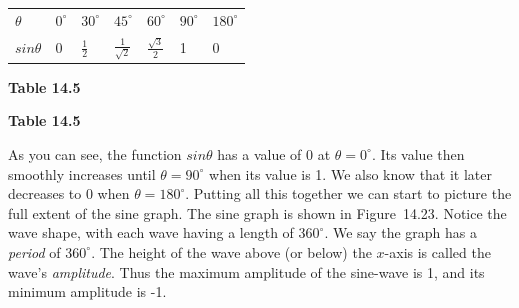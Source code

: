       \begin{table}[H]
        \begin{center}
      \label{m39414*id84073}
    \noindent
      \tablelasttail{}
      \begin{xtabular}[t]{|l|l|l|l|l|l|l|}\hline
                  $\theta $
                 &
                  ${0}^{\circ }$
                 &
                  ${30}^{\circ }$
                 &
                  ${45}^{\circ }$
                 &
                  ${60}^{\circ }$
                 &
                  ${90}^{\circ }$
                 &
                  ${180}^{\circ }$
     \tabularnewline{}
                  $sin\theta $
                 &
        0 &
                  $\frac{1}{2}$
                 &
                  $\frac{1}{\sqrt{2}}$
                 &
                  $\frac{\sqrt{3}}{2}$
                 &
        1 &
        0%
     \tabularnewline{}
    \end{xtabular}
      \end{center}
    \begin{center}{\small\bfseries Table 14.5}\end{center}
    \begin{caption}{\small\bfseries Table 14.5}\end{caption}
\end{table}
    \par
        \label{m39414*id84327}As you can see, the function $sin\theta $ has a value of 0 at $\theta ={0}^{\circ }$. Its value then smoothly increases until $\theta ={90}^{\circ }$ when its value is 1. We also know that it later decreases to 0 when $\theta ={180}^{\circ }$. Putting all this together we can start to picture the full extent of the sine graph. The sine graph is shown in Figure~14.23. Notice the wave shape, with each wave having a length of ${360}^{\circ }$. We say the graph has a \textsl{period} of ${360}^{\circ }$. The height of the wave above (or below) the $x$-axis is called the wave's \textsl{amplitude}. Thus the maximum amplitude of the sine-wave is 1, and its minimum amplitude is -1.\par 
